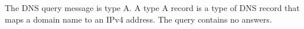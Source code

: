 The DNS query message is type A. A type A record is a type of DNS record that maps a domain name to an IPv4 address. 
\newline
\newline
The query contains no answers.